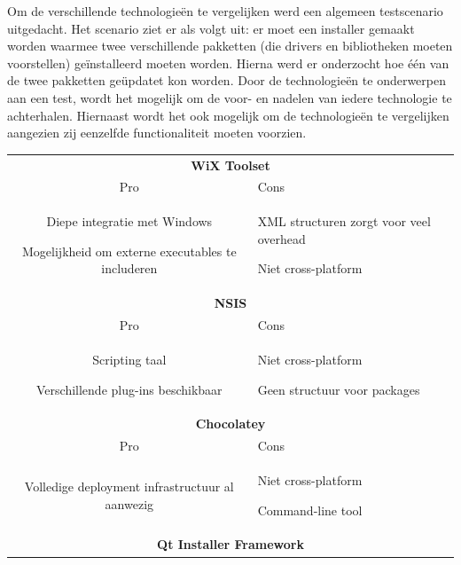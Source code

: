Om de verschillende technologieën te vergelijken werd een algemeen testscenario uitgedacht.
Het scenario ziet er als volgt uit: er moet een installer gemaakt worden waarmee twee verschillende pakketten (die drivers en bibliotheken moeten voorstellen) geïnstalleerd moeten worden.
Hierna werd er onderzocht hoe één van de twee pakketten geüpdatet kon worden.
Door de technologieën te onderwerpen aan een test, wordt het mogelijk om de voor- en nadelen van iedere technologie te achterhalen.
Hiernaast wordt het ook mogelijk om de technologieën te vergelijken aangezien zij eenzelfde functionaliteit moeten voorzien.

\begin{table}[]
\centering
\begin{tabular*}{\linewidth}{clll}
\hline
\multicolumn{4}{p{\linewidth}}{\centering \textbf{WiX Toolset}}                    \\ 
\multicolumn{2}{p{0.5\linewidth}}{\centering Pro} & \multicolumn{2}{p{0.5\linewidth}}{\centering Cons} \\ \hline
\multicolumn{2}{p{0.5\linewidth}}{Diepe integratie met Windows \par Mogelijkheid om externe executables te includeren}   & \multicolumn{2}{p{0.5\linewidth}}{XML structuren zorgt voor veel overhead \par Niet cross-platform}    \\ \hline
\multicolumn{4}{p{\linewidth}}{\centering \textbf{NSIS}}                           \\ 
\multicolumn{2}{p{0.5\linewidth}}{\centering Pro} & \multicolumn{2}{p{0.5\linewidth}}{\centering Cons} \\ \hline
\multicolumn{2}{p{0.5\linewidth}}{Scripting taal \par Verschillende plug-ins beschikbaar}   & \multicolumn{2}{p{0.5\linewidth}}{ Niet cross-platform \par Geen structuur voor packages}    \\ \hline
\multicolumn{4}{p{\linewidth}}{\centering \textbf{Chocolatey}}                     \\ 
\multicolumn{2}{p{0.5\linewidth}}{\centering Pro} & \multicolumn{2}{p{0.5\linewidth}}{\centering Cons} \\ \hline
\multicolumn{2}{p{0.5\linewidth}}{Volledige deployment infrastructuur al aanwezig}   & \multicolumn{2}{p{0.5\linewidth}}{Niet cross-platform \par Command-line tool}    \\ \hline
\multicolumn{4}{p{\linewidth}}{\centering \textbf{Qt Installer Framework}}         \\ 

\end{tabular*}
\end{table}
